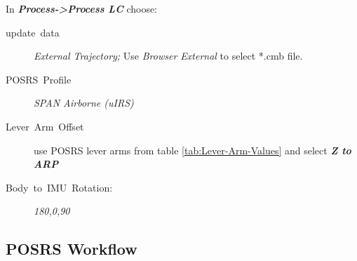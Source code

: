 \documentclass[11pt,fleqn]{book} %
\begin{document}
In \textbf{\emph{Process->Process LC}} choose:
\begin{description}
	\item [{update~data}] \emph{External Trajectory; }Use \emph{Browser External} to select {*}.cmb file.
	\item [{POSRS~Profile}] \emph{SPAN Airborne (uIRS)}
	\item [{Lever~Arm~Offset}] use POSRS lever arms from table \ref{tab:Lever-Arm-Values} and select \textbf{\emph{Z to ARP}}
	\item [{Body~to~IMU~Rotation:}] \emph{180,0,90 }
	\end{description}
	
\subsection{POSRS Workflow\label{sub:POSRS-Workflow}}
\end{document}
